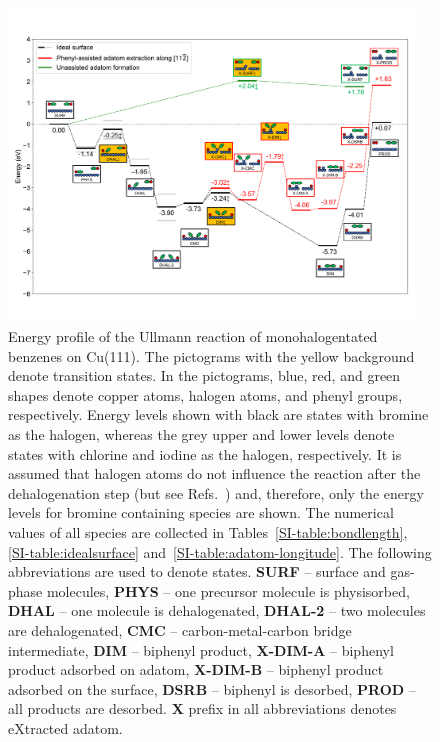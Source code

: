 \documentclass[aps,prb,amsmath,amssymb,11pt]{revtex4-1}
\newcommand{\zhzh}{\color{blue}}
\begin{document}
\begin{figure}[bt]
\centering
\includegraphics[width=0.96\textwidth]{Fig/main-profile.pdf}
\caption{
Energy profile of the Ullmann reaction of monohalogentated benzenes on Cu(111). {\zhzh The pictograms with the yellow background denote transition states.} In the pictograms, blue, red, and green shapes denote copper atoms, halogen atoms, and phenyl groups, respectively. %
Energy levels shown with black are states with bromine as the halogen, whereas the grey upper and lower levels denote states with chlorine and iodine as the halogen, respectively. It is assumed that halogen atoms do not influence the reaction after the dehalogenation step (but see Refs.~) and, therefore, only the energy levels for bromine containing species are shown. The numerical values of all species are collected in Tables~\ref{SI-table:bondlength}, \ref{SI-table:idealsurface} and~\ref{SI-table:adatom-longitude}. {\zhzh The following abbreviations are used to denote states. \textbf{SURF} -- surface and gas-phase molecules, \textbf{PHYS} -- one precursor molecule is physisorbed, \textbf{DHAL} -- one molecule is dehalogenated, \textbf{DHAL-2} -- two molecules are dehalogenated, \textbf{CMC} -- carbon-metal-carbon bridge intermediate, \textbf{DIM} -- biphenyl product, \textbf{X-DIM-A} -- biphenyl product adsorbed on adatom, \textbf{X-DIM-B} -- biphenyl product adsorbed on the surface, \textbf{DSRB} --  biphenyl is desorbed, \textbf{PROD} -- all products are desorbed. \textbf{X} prefix in all abbreviations denotes eXtracted adatom.}}
\label{fig:completeenergy}
\end{figure}
\end{document}
